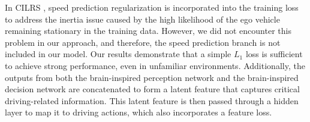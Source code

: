In CILRS \cite{Codevilla:2019}, speed prediction regularization is incorporated into the training loss to address the inertia issue caused by the high likelihood of the ego vehicle remaining stationary in the training data.
However, we did not encounter this problem in our approach, and therefore, the speed prediction branch is not included in our model.
Our results demonstrate that a simple $L_1$ loss is sufficient to achieve strong performance, even in unfamiliar environments.
%
Additionally, the outputs from both the brain-inspired perception network and the brain-inspired decision network are concatenated to form a latent feature that captures critical driving-related information. 
This latent feature is then passed through a hidden layer to map it to driving actions, which also incorporates a feature loss.


%



